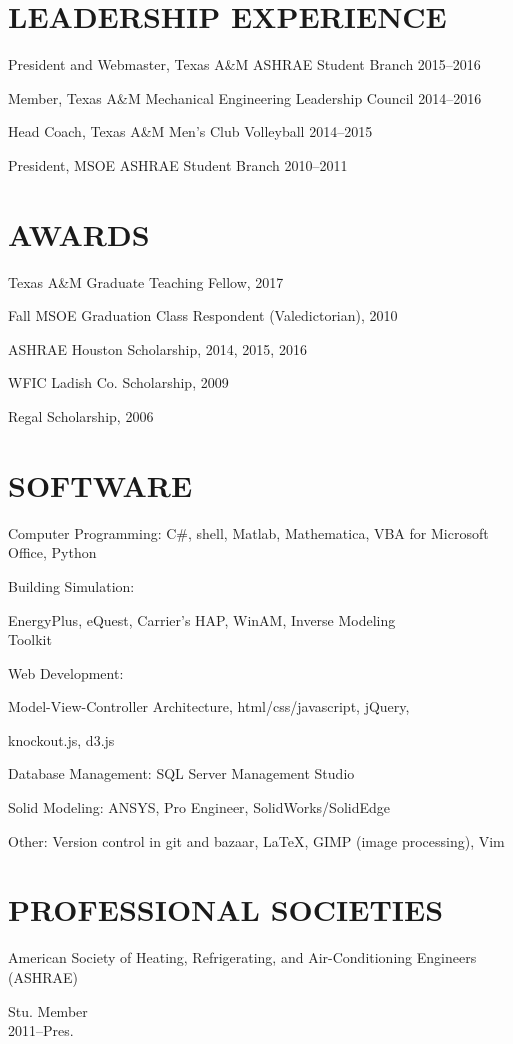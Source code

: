 \documentclass[margin]{res} %
\begin{document}
\begin{resume}
\section{LEADERSHIP EXPERIENCE}

President and Webmaster, Texas A\&M ASHRAE Student Branch \hfill 2015--2016

Member, Texas A\&M Mechanical Engineering Leadership Council \hfill 2014--2016

Head Coach, Texas A\&M Men's Club Volleyball \hfill 2014--2015\

President, MSOE ASHRAE Student Branch \hfill 2010--2011

\section{AWARDS}
Texas A\&M Graduate Teaching Fellow, 2017

Fall MSOE Graduation Class Respondent (Valedictorian), 2010

ASHRAE Houston Scholarship, 2014, 2015, 2016

WFIC Ladish Co. Scholarship, 2009

Regal Scholarship, 2006

\section{SOFTWARE}

Computer Programming: C\#, shell, Matlab, Mathematica, VBA for Microsoft Office, Python

Building Simulation: \parbox[t]{16cm}{ EnergyPlus, eQuest, Carrier's
HAP, WinAM, Inverse Modeling \\ Toolkit }

Web Development: \parbox[t]{20cm}{Model-View-Controller Architecture,
html/css/javascript, jQuery,\par knockout.js, d3.js}

Database Management: SQL Server Management Studio

Solid Modeling: ANSYS, Pro Engineer, SolidWorks/SolidEdge

Other: Version control in git and bazaar, \LaTeX, GIMP (image processing), Vim

\section{PROFESSIONAL SOCIETIES}

\parbox[t]{9cm}{American Society of Heating, Refrigerating, and Air-Conditioning Engineers (ASHRAE)} \hfill \parbox[t]{3cm}{\raggedleft Stu. Member \\ 2011--Pres.}


\end{resume}
\end{document}
